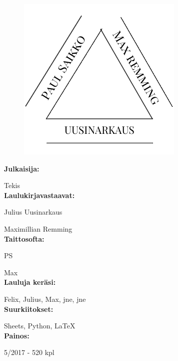 


\newpage
\begin{figure}[t]
\includegraphics[scale=0.82]{graphics/tekijat.pdf}
\centering
\end{figure}

\textbf{Julkaisija:}

Tekis
\\


\textbf{Laulukirjavastaavat:}

Julius Uusinarkaus

Maximillian Remming
\\

\textbf{Taittosofta:}

PS

Max
\\

\textbf{Lauluja keräsi:}

Felix, Julius, Max, jne, jne 
\\

\textbf{Suurkiitokset:}

Sheets, Python, \LaTeX
\\

\textbf{Painos:}

5/2017 - 520 kpl

\newpage

